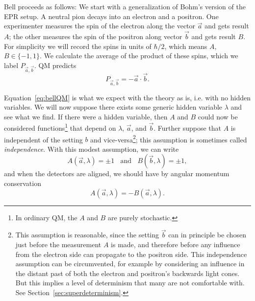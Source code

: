 Bell proceeds as follows: We start with a generalization of Bohm's version
of the EPR setup. A neutral pion decays into an electron and a positron.
One experimenter measures the spin of the electron along the vector
$\vec{a}$ and gets result $A$; the other measures the spin of the positron
along vector $\vec{b}$ and gets result $B$. For simplicity we will record
the spins in units of $\hbar/2$, which means $A$, $B\in\{-1,1\}$. We
calculate the average of the product of these spins, which we label 
$P_{\vec{a},\vec{b}}$.
QM predicts
\begin{equation}\label{eq:bellQM}
  P_{\vec{a},\vec{b}}=-\vec{a}\cdot\vec{b}.
\end{equation}

Equation~\eqref{eq:bellQM} is what we expect with the theory as is, i.e. with
no hidden variables.
We will now suppose there exists some generic hidden variable $\lambda$ and see
what we find. If there were a hidden variable, then $A$ and $B$ could now
be considered functions\footnote{In ordinary QM, the $A$ and $B$ are
purely stochastic.} that depend
on $\lambda$, $\vec{a}$, and $\vec{b}$. Further suppose
that $A$ is independent of the setting $b$ and
vice-versa\footnote{This assumption is reasonable, since the setting 
$\vec{b}$ can
in principle be chosen just before the measurement $A$ is made, and therefore
before any influence from the electron side can propagate to the positron side.
This independence assumption can be circumvented, for example by considering
an influence in the distant past of both the electron and positron's
backwards light cones. But this implies a level of determinism that many
are not comfortable with. See Section~\ref{sec:superdeterminism}.}; this
assumption is sometimes called {\it independence}. With this modest
assumption, we can write
\begin{equation}\label{eq:bellindep}
  A(\vec{a},\lambda)=\pm1~~~~\text{and}~~~~B(\vec{b},\lambda)=\pm1,
\end{equation}
and when the detectors are aligned, we should have by angular momentum 
conservation
\begin{equation}
  A(\vec{a},\lambda)=-B(\vec{a},\lambda).
\end{equation}

